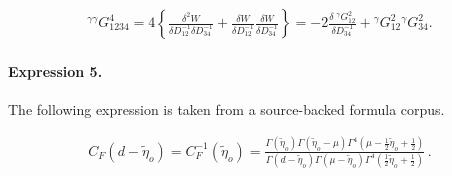 \documentclass[11pt]{article}
\begin{document}
\begin{align*} {}^{\gamma\gamma}G^{4}_{1234}=4 \left\{ \frac{\delta^2 W}{\delta D^{-1}_{12} \delta D^{-1}_{34}} + \frac{\delta W}{\delta D^{-1}_{12}}\frac{\delta W}{\delta D^{-1}_{34}} \right\}=-2\frac{\delta \;{}^\gamma G^{2}_{12}}{\delta D^{-1}_{34}} +{}^\gamma G^{2}_{12} {}^\gamma G^{2}_{34} .\end{align*}

\paragraph{Expression 5.} The following expression is taken from a source-backed formula corpus.

\begin{align*}C_{F}(d-\tilde{\eta}_{o})=C_{F}^{-1}(\tilde{\eta}_{o})= \frac{\Gamma(\tilde{\eta}_{o}) \Gamma(\tilde{\eta}_{o}-\mu)\Gamma^{4}(\mu-\frac{1}{2}\tilde{\eta}_{o} +\frac{1}{2})}{\Gamma(d-\tilde{\eta}_{o})\Gamma(\mu-\tilde{\eta}_{o}) \Gamma^{4}(\frac{1}{2}\tilde{\eta}_{o}+\frac{1}{2})}\,.\end{align*}
\end{document}
